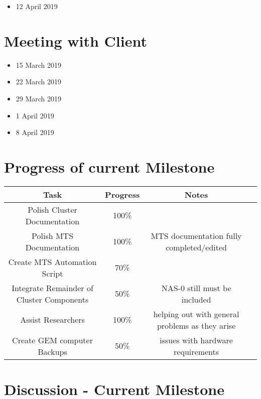 \documentclass[12pt]{article}
\begin{document}
\begin{itemize}
	\item 12 April 2019
\end{itemize}
\section{Meeting with Client}

\begin{itemize}
	\item 15 March 2019
	\item 22 March 2019
	\item 29 March 2019
	\item 1 April 2019
	\item 8 April 2019
\end{itemize}

\section{Progress of current Milestone}

\begin{adjustwidth}{-2.5cm}{}
  \begin{center}
      \begin{tabular}{|c|c|c|c|}
    	\hline
    	Task & Progress & Notes\\
    	\hline
    	Polish Cluster Documentation & 100\% & \\
    	Polish MTS Documentation & 100\% &  MTS documentation fully completed/edited\\
    	Create MTS Automation Script & 70\% &  \\
    	Integrate Remainder of Cluster Components & 50\% & NAS-0 still must be
                                               included \\
    	Assist Researchers & 100\% & helping out with general problems as they
                                     arise \\
        Create GEM computer Backups & 50\% & issues with
        									hardware requirements \\
        
    	\hline
    \end{tabular}
  \end{center}
\end{adjustwidth}



\section{Discussion - Current Milestone}
\end{document}
